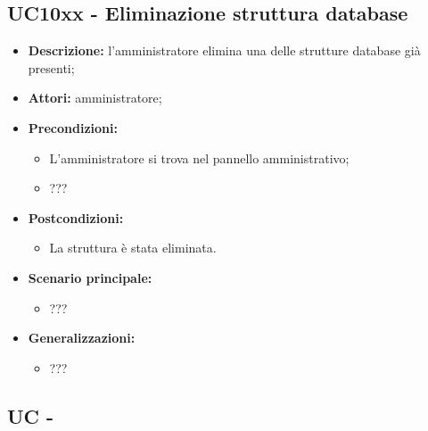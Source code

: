 \documentclass[5pt]{article}
\begin{document}
\subsection{UC10xx - Eliminazione struttura database}
\label{sec:10xxx}
\begin{itemize}
    \item \textbf{Descrizione:}  l’amministratore elimina una delle strutture database già presenti;
    \item \textbf{Attori:} amministratore;
    \item \textbf{Precondizioni:} 
    \begin{itemize}
        \item L’amministratore si trova nel pannello amministrativo;
        \item ???
    \end{itemize}
    \item \textbf{Postcondizioni:} 
    \begin{itemize}
        \item La struttura è stata eliminata.
    \end{itemize}
    \item \textbf{Scenario principale:} 
    \begin{itemize}
        \item ???
    \end{itemize}
    \item \textbf{Generalizzazioni:} 
    \begin{itemize}
        \item ???
    \end{itemize}
\end{itemize}

\subsection{UC - }
\label{sec:UC}

\fi
\end{document}

